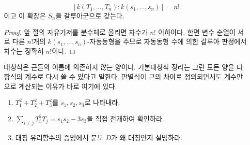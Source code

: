 \begin{corollary}
\[
  [k(T_1,\dots,T_n):k(s_1,\dots,s_n)]=n!
\]
이고 이 확장은 $S_n$을 갈루아군으로 갖는다.
\end{corollary}

\begin{proof}
앞 절의 자유기저를 분수체로 올리면 차수가 $n!$ 이하이다. 한편 변수 순열이 서로 다른 $n!$개의 $k(s_1,\dots,s_n)$-자동동형을 주므로 자동동형 수에 의한 갈루아 판정에서 차수는 정확히 $n!$이다.
\end{proof}

\begin{keyidea}
대칭식은 근들의 이름에 의존하지 않는 양이다. 기본대칭식 정리는 그런 모든 양을 다항식의 계수로 다시 쓸 수 있다고 말한다. 판별식이 근의 차이로 정의되면서도 계수만으로 계산되는 이유가 바로 여기에 있다.
\end{keyidea}

\begin{checkpoint}
\begin{enumerate}[label=(\alph*)]
  \item $T_1^2+T_2^2+T_3^2$를 $s_1,s_2,s_3$로 나타내라.
  \item $\sum_{i\ne j}T_i^2T_j=s_1s_2-3s_3$을 직접 전개하여 확인하라.
  \item 대칭 유리함수의 증명에서 분모 $D$가 왜 대칭인지 설명하라.
\end{enumerate}
\end{checkpoint}
